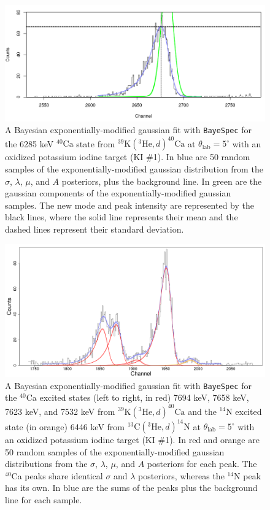 \begin{figure}
\centering
\includegraphics[width=5.8in]{Chapter-6/figs/ExpModGauss_Mode_and_Intensity.png}
\caption{\label{fig:EMG_Mode}A Bayesian exponentially-modified gaussian fit with \texttt{BayeSpec} for the 6285 keV $^{40}\mathrm{Ca}$ state from $^{39}\mathrm{K}(^{3}\mathrm{He},d)^{40}\mathrm{Ca}$ at $\theta_{\mathrm{lab}} = 5^{\circ}$ with an oxidized potassium iodine target (KI $\#$1). In blue are 50 random samples of the exponentially-modified gaussian distribution from the $\sigma$, $\lambda$, $\mu$, and $A$ posteriors, plus the background line. In green are the gaussian components of the exponentially-modified gaussian samples. The new mode and peak intensity are represented by the black lines, where the solid line represents their mean and the dashed lines represent their standard deviation.}
\end{figure}

\begin{figure}
\centering
\includegraphics[width=6in]{Chapter-6/figs/EMG_Multiplet.png}
\caption{\label{fig:EMG_Multiplet}A Bayesian exponentially-modified gaussian fit with \texttt{BayeSpec} for the $^{40}$Ca excited states (left to right, in red) 7694 keV, 7658 keV, 7623 keV, and 7532 keV from $^{39}\mathrm{K}(^{3}\mathrm{He},d)^{40}\mathrm{Ca}$ and the $^{14}$N excited state (in orange) 6446 keV from $^{13}\mathrm{C}(^{3}\mathrm{He},d)^{14}\mathrm{N}$ at $\theta_{\mathrm{lab}} = 5^{\circ}$ with an oxidized potassium iodine target (KI $\#$1). In red and orange are 50 random samples of the exponentially-modified gaussian distributions from the $\sigma$, $\lambda$, $\mu$, and $A$ posteriors for each peak. The $^{40}$Ca peaks share identical $\sigma$ and $\lambda$ posteriors, whereas the $^{14}$N peak has its own. In blue are the sums of the peaks plus the background line for each sample.}
\end{figure}

